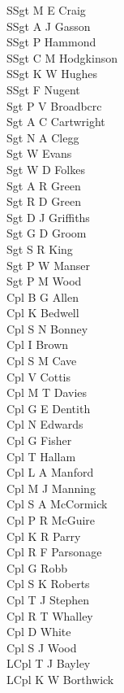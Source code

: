 \begin{multicols}{2}
  \noindent
  SSgt M E Craig \\
  SSgt A J Gasson \\
  SSgt P Hammond \\
  SSgt C M Hodgkinson \\
  SSgt K W Hughes \\
  SSgt F Nugent \\
  Sgt P V Broadbcrc \\
  Sgt A C Cartwright \\
  Sgt N A Clegg \\
  Sgt W Evans \\
  Sgt W D Folkes \\
  Sgt A R Green \\
  Sgt R D Green \\
  Sgt D J Griffiths \\
  Sgt G D Groom \\
  Sgt S R King \\
  Sgt P W Manser \\
  Sgt P M Wood \\
  Cpl B G Allen \\
  Cpl K Bedwell \\
  Cpl S N Bonney \\
  Cpl I Brown \\
  Cpl S M Cave \\
  Cpl V Cottis \\
  Cpl M T Davies \\
  Cpl G E Dentith \\
  Cpl N Edwards \\
  Cpl G Fisher \\
  Cpl T Hallam \\
  Cpl L A Manford \\
  Cpl M J Manning \\
  Cpl S A McCormick \\
  Cpl P R McGuire \\
  Cpl K R Parry \\
  Cpl R F Parsonage \\
  Cpl G Robb \\
  Cpl S K Roberts \\
  Cpl T J Stephen \\
  Cpl R T Whalley \\
  Cpl D White \\
  Cpl S J Wood \\
  LCpl T J Bayley \\
  LCpl K W Borthwick \\

\end{multicols}
